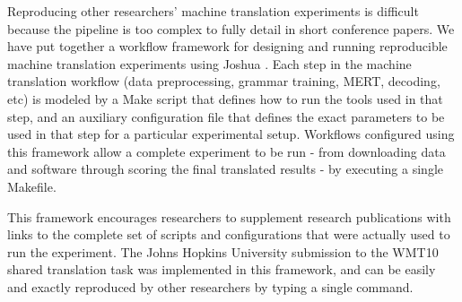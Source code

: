 \documentclass[11pt]{article}
\begin{document}
Reproducing other researchers' machine translation experiments is difficult because the pipeline is too complex to fully detail in short conference papers. We have put together a workflow framework for designing and running reproducible machine translation experiments using Joshua . Each step in the machine translation workflow (data preprocessing, grammar training, MERT, decoding, etc) is modeled by a Make script that defines how to run the tools used in that step, and an auxiliary configuration file that defines the exact parameters to be used in that step for a particular experimental setup. Workflows configured using this framework allow a complete experiment to be run - from downloading data and software through scoring the final translated results - by executing a single Makefile.

This framework encourages researchers to supplement research publications with links to the complete set of scripts and configurations that were actually used to run the experiment. The Johns Hopkins University submission to the WMT10 shared translation task was implemented in this framework, and can be easily and exactly reproduced by other researchers by typing a single command. 


\end{document}
